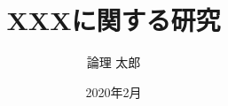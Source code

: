 \documentclass[a4paper,12pt,openany]{jbook}%
\title{XXXに関する研究}
\date{2020年2月}
\author{論理 太郎}
\begin{document}
\maketitle


\tableofcontents    %
\listoffigures      %
\listoftables       %
\lstlistoflistings  %









\end{document}
